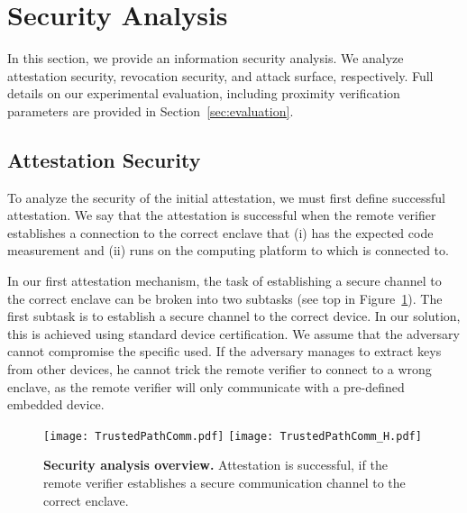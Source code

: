 
\section{Security Analysis}
\label{sec:analysis}

In this section, we provide an information security analysis. We analyze attestation security, revocation security, and attack surface, respectively. Full details on our experimental evaluation, including proximity verification parameters are provided in Section~\ref{sec:evaluation}.

\subsection{Attestation Security}

To analyze the security of the initial attestation, we must first define successful attestation. We say that the attestation is successful when the remote verifier establishes a connection to the correct enclave that (i) has the expected code measurement and (ii) runs on the computing platform to which \device is connected to.

\ifusenix
\vspace{-10pt}
\else
\fi
{} In our first attestation mechanism, the task of establishing a secure channel to the correct enclave can be broken into two subtasks (see top in Figure~\ref{fig:trustedPathCommunication}). The first subtask is to establish a secure channel to the correct \device device. In our solution, this is achieved using standard device certification. We assume that the adversary cannot compromise the specific \device used. If the adversary manages to extract keys from other \device devices, he cannot trick the remote verifier to connect to a wrong enclave, as the remote verifier will only communicate with a pre-defined embedded device.

\begin{figure}[t]
 \centering
  \ifusenix
  \texttt{[image: TrustedPathComm.pdf]}
  \else
  \texttt{[image: TrustedPathComm\_H.pdf]}
  \fi 
 \caption{\textbf{Security analysis overview.} Attestation is successful, if the remote verifier establishes a secure communication channel to the correct enclave.}
 \ifusenix
 \vspace{-15pt}
 \else
 \fi
 \label{fig:trustedPathCommunication}
\end{figure}

